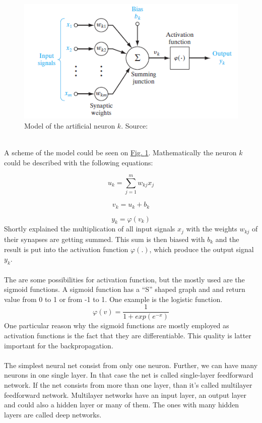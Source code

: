 \documentclass[runningheads,a4paper]{llncs}[2015/06/24]
\begin{document}
\begin{figure}[h]
\centering
\includegraphics[width=\textwidth]{neuronModel}
\caption{Model of the artificial neuron $k$. Source: \cite{haykin2009neural}}
\label{fig:neuronModel}
\end{figure}

\hspace{1cm}\\ A scheme of the model could be seen on \hyperref[fig:neuronModel]{Fig. \ref{fig:neuronModel}}. Mathematically the neuron $k$ could be described with the following equations:

\begin{equation}
u_k = \sum_{j=1}^{m} w_{kj}x_j
\end{equation}

\begin{equation}
v_k = u_k + b_k
\end{equation}

\begin{equation}
y_k = φ(v_k)
\end{equation}Shortly explained the multiplication of all input signals $x_j$ with the weights $w_{kj}$ of their synapses are getting summed. This sum is then biased with $b_k$ and the result is put into the activation function $φ(.)$, which produce the output signal $y_k$.\\\\
The are some possibilities for activation function, but the mostly used are the sigmoid functions. A sigmoid function has a \enquote{S} shaped graph and and return value from 0 to 1 or from -1 to 1. One example is the logistic function.
\begin{equation}
φ(v) = \frac{1}{1 + exp(e^{-x})}
\end{equation}
One particular reason why the sigmoid functions are mostly employed as activation functions is the fact that they are differentiable. This quality is latter important for the backpropagation. \\\\The simplest neural net consist from only one neuron. Further, we can have many neurons in one single layer. In that  case the net is called single-layer feedforward network. If the net consists from more than one layer, than it's called multilayer feedforward network. Multilayer networks have an input layer, an output layer and could also a hidden layer or many of them. The ones with many hidden layers are called deep networks\cite{haykin2009neural}.
\end{document}
